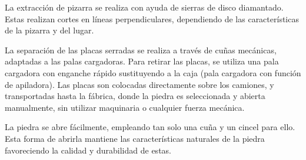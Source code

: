 La extracción de pizarra se realiza con ayuda  de sierras de disco
diamantado. Estas realizan cortes en líneas perpendiculares, dependiendo de las características
de la pizarra y del lugar.

La separación de las placas serradas se realiza a través de cuñas
mecánicas, adaptadas a las palas cargadoras. Para retirar las
placas, se utiliza una pala cargadora con enganche rápido
sustituyendo a la caja (pala cargadora con función de apiladora).
Las placas son colocadas directamente sobre los camiones, y transportadas hasta la fábrica,
donde la piedra es seleccionada y abierta manualmente, sin utilizar maquinaria o cualquier
fuerza mecánica.

La piedra se abre fácilmente, empleando tan solo una cuña y un cincel para ello. Esta forma de
abrirla mantiene las características naturales de la piedra favoreciendo la calidad y durabilidad
de estas.

